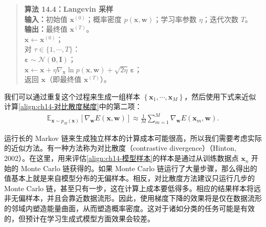 \documentclass[../../main.tex]{subfiles}
\begin{document}
\begin{quote}
\small
\textbf{算法 14.4：Langevin 采样}\\
\textbf{输入：}初始值 $\bm{x}^{(0)}$；概率密度 $p(\bm{x},\bm{w})$；学习率参数 $\eta$；迭代次数 $T$。\\
\textbf{输出：}最终值 $\bm{x}^{(T)}$。\\
$\bm{x}\leftarrow\bm{x}^{(0)}$；\\
对 $\tau\in\{1,\cdots,T\}$：\\
\quad $\bm{\varepsilon}\sim\mathcal{N}(\bm{0},\bm{I})$；\\
\quad $\bm{x}\leftarrow\bm{x}+\eta\nabla_{\bm{x}}\ln p(\bm{x},\bm{w})+\sqrt{2\eta}\,\bm{\varepsilon}$；\\
返回 $\bm{x}$（即最终值 $\bm{x}^{(T)}$）。
\end{quote}

我们可以通过重复这个过程来生成一组样本 $\left\{\bm{x}_{1},\cdots,\bm{x}_{M}\right\}$，然后使用下式来近似计算\eqref{align:ch14-对比散度梯度}中的第二项：
\begin{align}
\mathbb{E}_{\bm{x}\sim p_{M}(\bm{x})}\left[\nabla_{\bm{w}}E(\bm{x},\bm{w})\right]\approx\frac{1}{M}\sum_{m=1}^{M}\nabla_{\bm{w}}E\!\left(\bm{x}_{m},\bm{w}\right).
\label{align:ch14-模型样本}
\end{align}

运行长的 Markov 链来生成独立样本的计算成本可能很高，所以我们需要考虑实际的近似方法。有一种方法称为对比散度（contrastive divergence）（Hinton, 2002）。在这里，用来评估\eqref{align:ch14-模型样本}的样本是通过从训练数据点 $\bm{x}_{n}$ 开始的 Monte Carlo 链获得的。如果 Monte Carlo 链运行了大量步骤，那么得出的值基本上就是来自模型分布的无偏样本。相反，对比散度方法建议只运行几步的 Monte Carlo 链，甚至只有一步，这在计算上成本要低得多。相应的结果样本将远非无偏样本，并且会靠近数据流形。因此，使用梯度下降的效果将是仅在数据流形的邻域内塑造能量曲面，从而塑造概率密度。这对于诸如分类的任务可能是有效的，但预计在学习生成式模型方面效果会较差。
\end{document}
